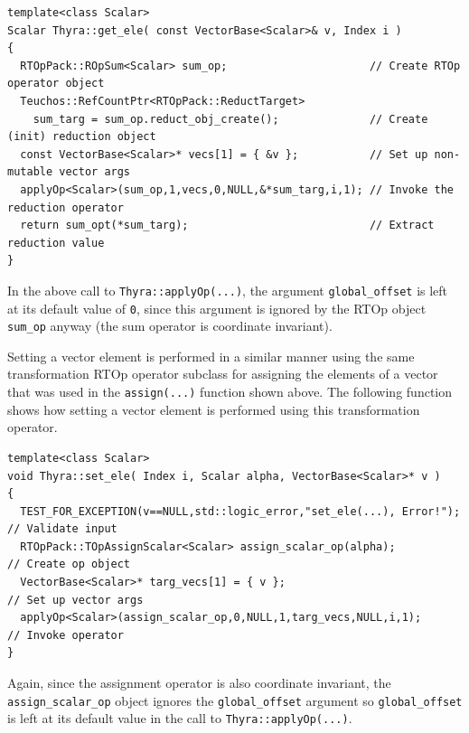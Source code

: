 \documentclass[pdf,ps2pdf,11pt]{SANDreport}
\begin{document}
{\scriptsize\begin{verbatim}
template<class Scalar>
Scalar Thyra::get_ele( const VectorBase<Scalar>& v, Index i )
{
  RTOpPack::ROpSum<Scalar> sum_op;                      // Create RTOp operator object
  Teuchos::RefCountPtr<RTOpPack::ReductTarget>
    sum_targ = sum_op.reduct_obj_create();              // Create (init) reduction object
  const VectorBase<Scalar>* vecs[1] = { &v };           // Set up non-mutable vector args
  applyOp<Scalar>(sum_op,1,vecs,0,NULL,&*sum_targ,i,1); // Invoke the reduction operator
  return sum_opt(*sum_targ);                            // Extract reduction value
}
\end{verbatim}}

{}\noindent{}In the above call to {}\texttt{Thyra::applyOp(\-...)},
the argument {}\texttt{global\_offset} is left at its default value of
{}\texttt{0}, since this argument is ignored by the RTOp object
{}\texttt{sum\_op} anyway (the sum operator is coordinate invariant).

Setting a vector element is performed in a similar manner using the
same transformation RTOp operator subclass for assigning the elements
of a vector that was used in the {}\texttt{assign(...)} function shown
above.  The following function shows how setting a vector element is
performed using this transformation operator.

{\scriptsize\begin{verbatim}
template<class Scalar>
void Thyra::set_ele( Index i, Scalar alpha, VectorBase<Scalar>* v )
{
  TEST_FOR_EXCEPTION(v==NULL,std::logic_error,"set_ele(...), Error!"); // Validate input
  RTOpPack::TOpAssignScalar<Scalar> assign_scalar_op(alpha);           // Create op object
  VectorBase<Scalar>* targ_vecs[1] = { v };                            // Set up vector args
  applyOp<Scalar>(assign_scalar_op,0,NULL,1,targ_vecs,NULL,i,1);       // Invoke operator
}
\end{verbatim}}

{}\noindent{}Again, since the assignment operator is also coordinate
invariant, the {}\texttt{assign\_scalar\_op} object ignores the
{}\texttt{global\_offset} argument so {}\texttt{global\_offset} is
left at its default value in the call to
{}\texttt{Thyra::applyOp(\-...)}.
\end{document}

